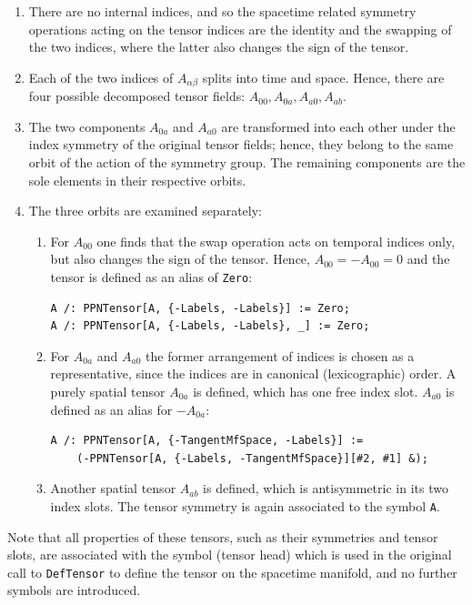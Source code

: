 \documentclass[notitlepage,a4paper,aps,prd,onecolumn,superscriptaddress,nofootinbib,groupedaddress,longbibliography]{revtex4-1}
\begin{document}
\begin{enumerate}
\item
There are no internal indices, and so the spacetime related symmetry operations acting on the tensor indices are the identity and the swapping of the two indices, where the latter also changes the sign of the tensor.
\item
Each of the two indices of \(A_{\alpha\beta}\) splits into time and space. Hence, there are four possible decomposed tensor fields: \(A_{00}, A_{0a}, A_{a0}, A_{ab}\).
\item
The two components \(A_{0a}\) and \(A_{a0}\) are transformed into each other under the index symmetry of the original tensor fields; hence, they belong to the same orbit of the action of the symmetry group. The remaining components are the sole elements in their respective orbits.
\item
The three orbits are examined separately:
\begin{enumerate}
\item
For \(A_{00}\) one finds that the swap operation acts on temporal indices only, but also changes the sign of the tensor. Hence, \(A_{00} = -A_{00} = 0\) and the tensor is defined as an alias of \lstinline/Zero/:
\begin{lstlisting}
A /: PPNTensor[A, {-Labels, -Labels}] := Zero;
A /: PPNTensor[A, {-Labels, -Labels}, _] := Zero;
\end{lstlisting}
\item
For \(A_{0a}\) and \(A_{a0}\) the former arrangement of indices is chosen as a representative, since the indices are in canonical (lexicographic) order. A purely spatial tensor \(A_{0a}\) is defined, which has one free index slot. \(A_{a0}\) is defined as an alias for \(-A_{0a}\):
\begin{lstlisting}
A /: PPNTensor[A, {-TangentMfSpace, -Labels}] :=
	(-PPNTensor[A, {-Labels, -TangentMfSpace}][#2, #1] &);
\end{lstlisting}
\item
Another spatial tensor \(A_{ab}\) is defined, which is antisymmetric in its two index slots. The tensor symmetry is again associated to the symbol \lstinline/A/.
\end{enumerate}
\end{enumerate}
Note that all properties of these tensors, such as their symmetries and tensor slots, are associated with the symbol (tensor head) which is used in the original call to \lstinline/DefTensor/ to define the tensor on the spacetime manifold, and no further symbols are introduced.
\end{document}
